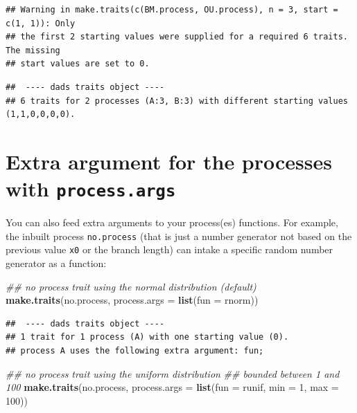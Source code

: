 \documentclass[]{book}
\newenvironment{Shaded}{\begin{snugshade}}{\end{snugshade}}
\newcommand{\CommentTok}[1]{\textcolor[rgb]{0.56,0.35,0.01}{\textit{#1}}}
\newcommand{\DataTypeTok}[1]{\textcolor[rgb]{0.13,0.29,0.53}{#1}}
\newcommand{\DecValTok}[1]{\textcolor[rgb]{0.00,0.00,0.81}{#1}}
\newcommand{\KeywordTok}[1]{\textcolor[rgb]{0.13,0.29,0.53}{\textbf{#1}}}
\newcommand{\NormalTok}[1]{#1}
\begin{document}
\begin{verbatim}
## Warning in make.traits(c(BM.process, OU.process), n = 3, start = c(1, 1)): Only
## the first 2 starting values were supplied for a required 6 traits. The missing
## start values are set to 0.
\end{verbatim}

\begin{verbatim}
##  ---- dads traits object ---- 
## 6 traits for 2 processes (A:3, B:3) with different starting values (1,1,0,0,0,0).
\end{verbatim}

\hypertarget{extra-argument-for-the-processes-with-process.args}{%
\section{\texorpdfstring{Extra argument for the processes with \texttt{process.args}}{Extra argument for the processes with process.args}}\label{extra-argument-for-the-processes-with-process.args}}

You can also feed extra arguments to your process(es) functions. For example, the inbuilt process \texttt{no.process} (that is just a number generator not based on the previous value \texttt{x0} or the branch length) can intake a specific random number generator as a function:

\begin{Shaded}
\begin{Highlighting}[]
\CommentTok{## no process trait using the normal distribution (default)}
\KeywordTok{make.traits}\NormalTok{(no.process, }\DataTypeTok{process.args =} \KeywordTok{list}\NormalTok{(}\DataTypeTok{fun =}\NormalTok{ rnorm))}
\end{Highlighting}
\end{Shaded}

\begin{verbatim}
##  ---- dads traits object ---- 
## 1 trait for 1 process (A) with one starting value (0).
## process A uses the following extra argument: fun;
\end{verbatim}

\begin{Shaded}
\begin{Highlighting}[]
\CommentTok{## no process trait using the uniform distribution}
\CommentTok{## bounded between 1 and 100}
\KeywordTok{make.traits}\NormalTok{(no.process, }\DataTypeTok{process.args =} \KeywordTok{list}\NormalTok{(}\DataTypeTok{fun =}\NormalTok{ runif, }\DataTypeTok{min =} \DecValTok{1}\NormalTok{, }\DataTypeTok{max =} \DecValTok{100}\NormalTok{))}
\end{Highlighting}
\end{Shaded}
\end{document}
